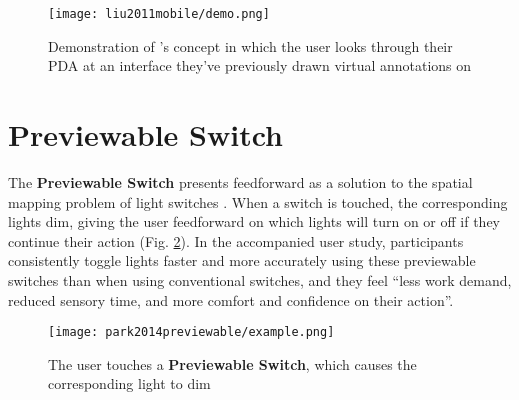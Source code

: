 \begin{figure}
    \centering
    \texttt{[image: liu2011mobile/demo.png]}
    \caption{Demonstration of \textbf{\citeauthor{liu2011mobile}}'s concept in which the user looks through their PDA at an interface they've previously drawn virtual annotations on \cite{liu2011mobile}}
    \label{fig:liu2011mobile_demo}
\end{figure}

\section{Previewable Switch} \label{sec:related_work:previewable_switch}
The \textbf{Previewable Switch} presents feedforward as a solution to the spatial mapping problem of light switches \cite{park2014previewable}. When a switch is touched, the corresponding lights dim, giving the user feedforward on which lights will turn on or off if they continue their action (Fig. \ref{fig:park2014previewable_demo}). In the accompanied user study, participants consistently toggle lights faster and more accurately using these previewable switches than when using conventional switches, and they feel ``less work demand, reduced sensory time, and more comfort and confidence on their action''.

\begin{figure}
    \centering
    \texttt{[image: park2014previewable/example.png]}
    \caption{The user touches a \textbf{Previewable Switch}, which causes the corresponding light to dim \cite{park2014previewable}}
    \label{fig:park2014previewable_demo}
\end{figure}


